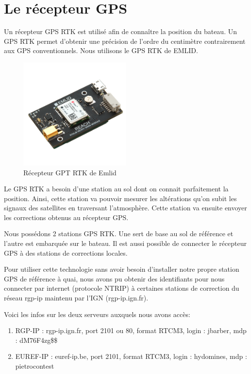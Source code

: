 \documentclass[a4paper, 11pt]{report}
\begin{document}
\section{Le récepteur GPS}
Un récepteur GPS RTK est utilisé afin de connaître la position du bateau. Un GPS RTK permet d'obtenir une précision de l'ordre du centimètre contrairement aux GPS conventionnels. Nous utilisons le GPS RTK de EMLID.

\begin{figure}[h]
	\begin{center}
		\includegraphics[width=0.5\textwidth]{images/gps.png}
		\caption{Récepteur GPT RTK de Emlid}
	\end{center}
\end{figure}

Le GPS RTK a besoin d'une station au sol dont on connait parfaitement la position. Ainsi, cette station va pouvoir mesurer les altérations qu'on subit les signaux des satellites en traversant l'atmosphère. Cette station va ensuite envoyer les corrections obtenus au récepteur GPS.

Nous possédons 2 stations GPS RTK. Une sert de base au sol de référence et l'autre est embarquée sur le bateau. Il est aussi possible de connecter le récepteur GPS à des stations de corrections locales.

Pour utiliser cette technologie sans avoir besoin d'installer notre
propre station GPS de référence à quai, nous avons pu obtenir des
identifiants pour nous connecter par internet (protocole NTRIP) à
certaines stations de correction du réseau rgp-ip maintenu par l'IGN
(rgp-ip.ign.fr).

Voici les infos sur les deux serveurs auxquels nous avons accès:
\begin{enumerate}
\item RGP-IP : rgp-ip.ign.fr, port 2101 ou 80, format RTCM3, login : jbarber, mdp : dM76F4zg\$\$

\item EUREF-IP : euref-ip.be, port 2101, format RTCM3, login : hydomines, mdp : pietrocontest
\end{enumerate}
\end{document}
